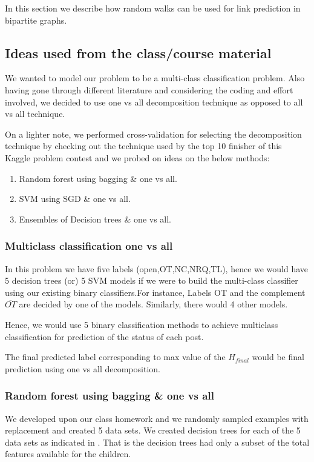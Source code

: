\documentclass[letterpaper,twocolumn,11pt]{article}
\begin{document}
In this section we describe how random walks can be used for link prediction in bipartite graphs.

\subsection{Ideas used from the class/course material}
We wanted to model our problem to be a multi-class classification problem. Also having gone through different literature and considering the coding and effort involved, we decided to use one vs all decomposition technique as opposed to all vs all technique.

On a lighter note, we performed cross-validation for selecting the decomposition technique by checking out the technique used by the top 10 finisher of this Kaggle problem contest and we probed on ideas on the below methods:
\begin{enumerate}
\itemsep0em
\item Random forest using bagging \& one vs all.
\item SVM using SGD \& one vs all.
\item Ensembles of Decision trees \& one vs all.
\end{enumerate}

\subsubsection{Multiclass classification one vs all}
In this problem we have five labels (open,OT,NC,NRQ,TL), hence we would have 5 decision trees (or) 5 SVM models if we were to build the multi-class classifier using our existing binary classifiers.For instance, Labels OT and the complement $\overline{OT}$ are decided by one of the models. Similarly, there would 4 other models. 

Hence, we would use 5 binary classification methods to achieve multiclass classification for prediction of the status of each post.

The final predicted label corresponding to max value of the $H_{final}$ would be final prediction using one vs all decomposition.

\subsubsection{Random forest using bagging \& one vs all}

We developed upon our class homework and we randomly sampled examples with replacement and created 5 data sets. We created decision trees for each of the 5 data sets as indicated in \cite{rfwiki}. That is the decision trees had only a subset of the total features available for the children.
\end{document}
